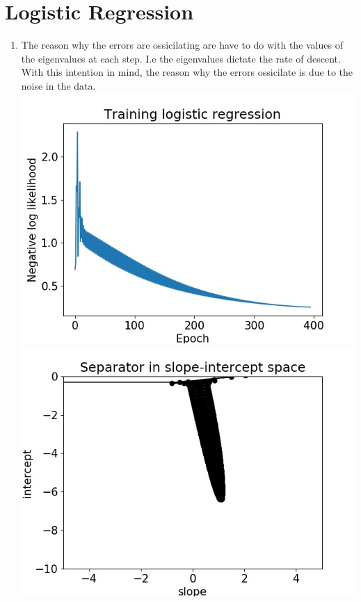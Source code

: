 \documentclass[12pt,letterpaper]{article}
\begin{document}
\section{Logistic Regression}

\begin{enumerate}

	\item The reason why the errors are ossicilating are have to do with the values of the eigenvalues at each step. I.e
	the eigenvalues dictate the rate of descent. With this intention in mind, the reason why the errors ossicilate is due to the noise in the data.
	\includegraphics[width=\textwidth]{Figure3}
	\centering
	\includegraphics[width=\textwidth]{F2}
	\centering


\end{enumerate}
\end{document}
